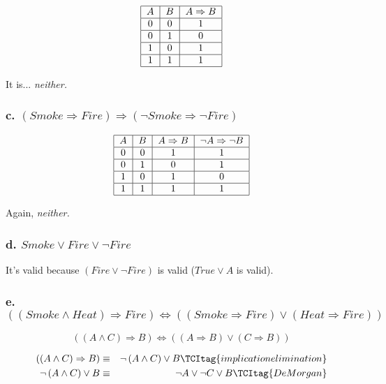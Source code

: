 \documentclass{article}
\begin{document}
\[
\begin{tabular}{|c|c|c|}
\hline
$A$ & $B$ & $A\Rightarrow B$ \\ \hline
0 & 0 & 1 \\ \hline
0 & 1 & 0 \\ \hline
1 & 0 & 1 \\ \hline
1 & 1 & 1 \\ \hline
\end{tabular}%
\]

It is... \textit{neither.}

\subsubsection{c. $\left( Smoke\Rightarrow Fire\right) \Rightarrow \left(
\lnot Smoke\Rightarrow \lnot Fire\right) $}

\[
\begin{tabular}{|c|c|c|c|}
\hline
$A$ & $B$ & $A\Rightarrow B$ & $\lnot A\Rightarrow \lnot B$ \\ \hline
0 & 0 & 1 & 1 \\ \hline
0 & 1 & 0 & 1 \\ \hline
1 & 0 & 1 & 0 \\ \hline
1 & 1 & 1 & 1 \\ \hline
\end{tabular}%
\]

Again, \textit{neither.}

\subsubsection{d. $Smoke\vee Fire\vee \lnot Fire$}

It's valid because $\left( Fire\vee \lnot Fire\right) $ is valid ($True\vee
A $ is valid).

\subsubsection{e. $\left( \left( Smoke\wedge Heat\right) \Rightarrow
Fire\right) \Leftrightarrow \left( \left( Smoke\Rightarrow Fire\right) \vee
\left( Heat\Rightarrow Fire\right) \right) $}

\[
\left( \left( A\wedge C\right) \Rightarrow B\right) \Leftrightarrow \left(
\left( A\Rightarrow B\right) \vee \left( C\Rightarrow B\right) \right) 
\]

\begin{eqnarray}
\left( \left( A\wedge C\right) \Rightarrow B\right) &\equiv &\lnot \left(
A\wedge C\right) \vee B  \TCItag{implication elimination} \\
\lnot \left( A\wedge C\right) \vee B &\equiv &\lnot A\vee \lnot C\vee B 
\TCItag{De Morgan}
\end{eqnarray}
\end{document}

